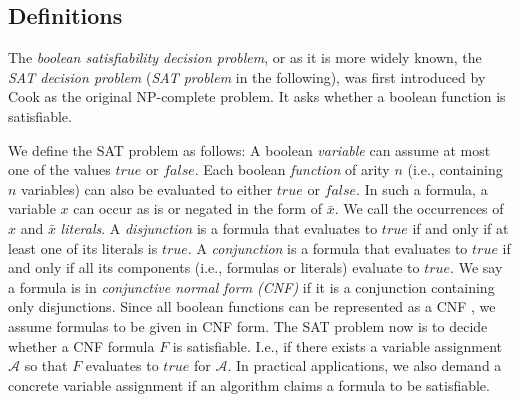 \documentclass[12pt,a4paper,twoside]{scrartcl}
\numberwithin{equation}{section}
\begin{document}
\subsection{Definitions}
\label{sec:definitions}



The \textit{boolean satisfiability decision problem}, or as it is more widely known, the \textit{SAT decision problem} (\textit{SAT problem} in the following), was first introduced by Cook \cite{satProblem} as the original NP-complete problem. It asks whether a boolean function is satisfiable.

We define the SAT problem as follows:
A boolean \textit{variable} can assume at most one of the values $true$ or $false$. Each boolean \textit{function} of arity $n$ (i.e., containing $n$ variables) can also be evaluated to either $true$ or $false$. In such a formula, a variable $x$ can occur as is or negated in the form of $\bar{x}$. We call the occurrences of $x$ and $\bar{x}$ \textit{literals}. A \textit{disjunction} is a formula that evaluates to $true$ if and only if at least one of its literals is $true$. A \textit{conjunction} is a formula that evaluates to $true$ if and only if all its components (i.e., formulas or literals) evaluate to $true$. We say a formula is in \textit{conjunctive normal form (CNF)} if it is a conjunction containing only disjunctions. Since all boolean functions can be represented as a CNF \cite{cnfPaper}, we assume formulas to be given in CNF form. 
The SAT problem now is to decide whether a CNF formula $F$ is satisfiable. I.e., if there exists a variable assignment $\mathcal{A}$ so that $F$ evaluates to $true$ for $\mathcal{A}$. In practical applications, we also demand a concrete variable assignment if an algorithm claims a formula to be satisfiable.

\end{document}
